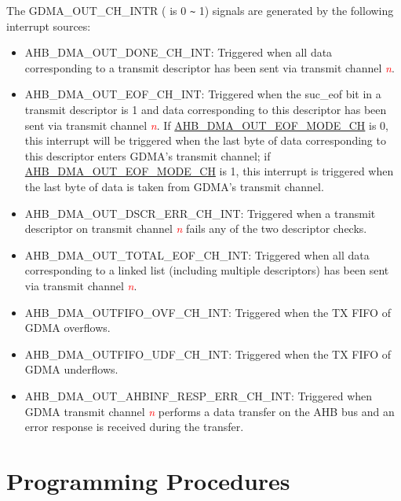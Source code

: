 \documentclass[main\_\_EN.tex]{subfiles}
\begin{document}
The GDMA\_OUT\_CH\_INTR ( is 0 \verb+~+ 1) signals are generated by the following interrupt sources:

\begin{itemize}
    \item \label{int:GDMAOUTDONEINT}AHB\_DMA\_OUT\_DONE\_CH\_INT: Triggered when all data corresponding to a transmit descriptor has been sent via transmit channel \textcolor{red}{\it{n}}.
    \item \label{int:GDMAOUTEOFINT}AHB\_DMA\_OUT\_EOF\_CH\_INT: Triggered when the suc\_eof bit in a transmit descriptor is 1 and data corresponding to this descriptor has been sent via transmit channel \textcolor{red}{\it{n}}. If \hyperref[fielddesc:AHBDMAOUTEOFMODECHN]{AHB\_DMA\_OUT\_EOF\_MODE\_CH} is 0, this interrupt will be triggered when the last byte of data corresponding to this descriptor enters GDMA's transmit channel; if \hyperref[fielddesc:AHBDMAOUTEOFMODECHN]{AHB\_DMA\_OUT\_EOF\_MODE\_CH} is 1, this interrupt is triggered when the last byte of data is taken from GDMA's transmit channel.
    \item \label{int:GDMAOUTDSCRERRINT}AHB\_DMA\_OUT\_DSCR\_ERR\_CH\_INT: Triggered when a transmit descriptor on transmit channel \textcolor{red}{\it{n}} fails any of the two descriptor checks.
    \item \label{int: GDMAOUTTOTALEOFINT}AHB\_DMA\_OUT\_TOTAL\_EOF\_CH\_INT: Triggered when all data corresponding to a linked list (including multiple descriptors) has been sent via transmit channel \textcolor{red}{\it{n}}.
    \item \label{int:GDMAOUTFIFOOVFINT}AHB\_DMA\_OUTFIFO\_OVF\_CH\_INT: Triggered when the TX FIFO of GDMA overflows.
    \item \label{int:GDMAOUTFIFOUDFINT}AHB\_DMA\_OUTFIFO\_UDF\_CH\_INT: Triggered when the TX FIFO of GDMA underflows.
    \item \label{int:GDMAOUTAHBINFRESPERRINT}AHB\_DMA\_OUT\_AHBINF\_RESP\_ERR\_CH\_INT: Triggered when GDMA transmit channel \textcolor{red}{\it{n}} performs a data transfer on the AHB bus and an error response is received during the transfer.
\end{itemize}


\section{Programming Procedures}
\end{document}
